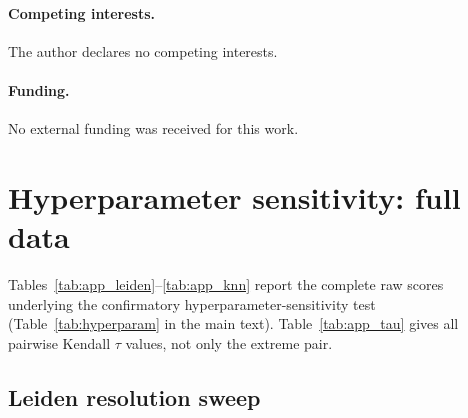 \documentclass[9pt,lineno]{elife}
\begin{document}
\paragraph{Competing interests.} The author declares no competing interests.

\paragraph{Funding.} No external funding was received for this work.




\appendix

\section{Hyperparameter sensitivity: full data}
\label{app:hyperparam}

Tables~\ref{tab:app_leiden}--\ref{tab:app_knn} report the complete raw scores underlying the confirmatory hyperparameter-sensitivity test (Table~\ref{tab:hyperparam} in the main text). Table~\ref{tab:app_tau} gives all pairwise Kendall $\tau$ values, not only the extreme pair.

\subsection{Leiden resolution sweep}
\end{document}
